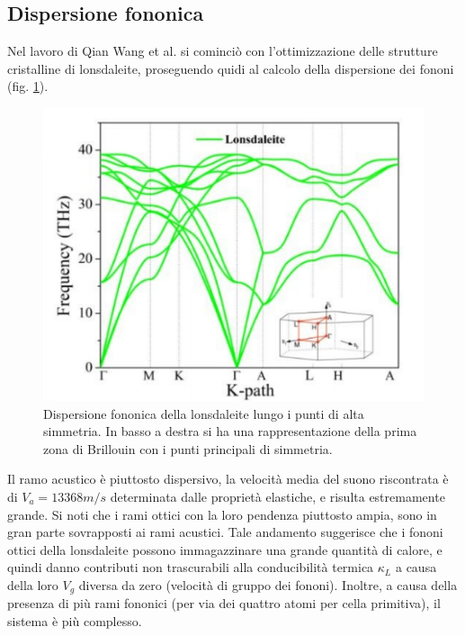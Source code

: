 \documentclass[a4paper,titlepage]{book}
\begin{document}
\subsection{Dispersione fononica}
Nel lavoro di Qian Wang et al. \cite{Qian}  si cominciò con l'ottimizzazione delle strutture cristalline di lonsdaleite, proseguendo quidi al calcolo della dispersione dei fononi (fig. \ref{ehehe}). 
\begin{figure}[h!] 
	\centering
	\includegraphics[width=0.7\columnwidth]{phonolonsda.png}
	\caption{ 	\label{ehehe}
		Dispersione fononica della lonsdaleite lungo i punti di alta simmetria. In basso a destra si ha una rappresentazione della prima zona di Brillouin con i punti principali di simmetria.
	}
\end{figure}
Il ramo acustico è piuttosto dispersivo, la velocità media del suono riscontrata è di $V_a = 13368 m/s$ determinata dalle proprietà elastiche, e risulta estremamente grande. Si noti che i rami ottici con la loro pendenza piuttosto ampia, sono in gran parte sovrapposti ai rami acustici. 
Tale andamento suggerisce che i fononi ottici della lonsdaleite possono immagazzinare una grande quantità di calore, e quindi danno contributi non trascurabili alla conducibilità termica $\kappa_L$ a causa della loro $V_g$ diversa da zero (velocità di gruppo dei fononi). Inoltre, a causa della presenza di più rami fononici (per via dei quattro atomi per cella primitiva), il sistema è più complesso.
\end{document}
